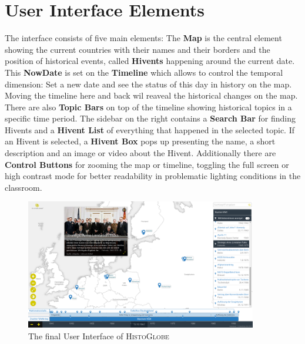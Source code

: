 \section{User Interface Elements} %
\label{sec:user_interface_elements}

The interface consists of five main elements: The \textbf{Map} is the central element showing the current countries with their names and their borders and the position of historical events, called \textbf{Hivents} happening around the current date. This \textbf{NowDate} is set on the \textbf{Timeline} which allows to control the temporal dimension: Set a new date and see the status of this day in history on the map. Moving the timeline here and back wil reaveal the historical changes on the map. There are also \textbf{Topic Bars} on top of the timeline showing historical topics in a specific time period. The sidebar on the right contains a \textbf{Search Bar} for finding Hivents and a \textbf{Hivent List} of everything that happened in the selected topic. If an Hivent is selected, a \textbf{Hivent Box} pops up presenting the name, a short description and an image or video about the Hivent. Additionally there are \textbf{Control Buttons} for zooming the map or timeline, toggling the full screen or high contrast mode for better readability in problematic lighting conditions in the classroom.

\begin{figure}[H]
  \centering
  \includegraphics[width=0.9\textwidth]{graphics/final_ui.png}
  \caption{The final User Interface of \textsc{HistoGlobe}}
\end{figure}









